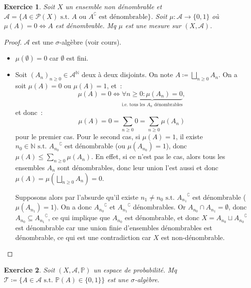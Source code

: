 \documentclass{article}
\newtheorem{ex}{Exercice}[section]
\newcommand{\st}{\text{ s.t. }}
\newcommand{\C}{\complement}
\newcommand{\N}{{\mathbb N}}
\renewcommand{\P}{{\mathbb P}}
\begin{document}
\begin{ex} Soit $X$ un ensemble non dénombrable et $\mathcal A = \{A \in \mathcal P(X) \st A \text{ ou } A^\C \text{ est dénombrable}\}$. Soit $\mu : \mathcal A \to \{0, 1\}$
où $\mu(A) = 0 \iff A$ est dénombrable. Mq $\mu$ est une mesure sur $(X, \mathcal A)$.
\end{ex}

\begin{proof} $\mathcal A$ est une $\sigma$-algèbre (voir cours).
\begin{itemize}
	\item $\mu(\emptyset) = 0$ car $\emptyset$ est fini.
	\item Soit $(A_n)_{n \geq 0} \in \mathcal A^\N$ deux à deux disjoints. On note $A \coloneqq \bigsqcup_{n \geq 0}A_n$. On a soit $\mu(A) = 0$ ou $\mu(A) = 1$, et~:
	\[\mu(A) = 0 \iff \underbrace {\forall n \geq 0 : \mu(A_n) = 0}_{\text{i.e. tous les $A_n$ dénombrables}},\]
	et donc~:
	\[\mu(A) = 0 = \sum_{n \geq 0}0 = \sum_{n \geq 0}\mu(A_n)\]
	pour le premier cas. Pour le second cas, si $\mu(A) = 1$, il existe $n_0 \in \N \st {A_{n_0}}^\C$ est dénombrable (ou $\mu(A_{n_0}) = 1$), donc $\mu(A) \leq \sum_{n \geq 0}\mu(A_n)$.
	En effet, si ce n'est pas le cas, alors tous les ensembles $A_n$ sont dénombrables, donc leur union l'est aussi et donc $\mu(A) = \mu(\bigsqcup_{n \geq 0}A_n) = 0$.

	Supposons alors par l'absurde qu'il existe $n_1 \neq n_0 \st {A_{n_1}}^\C$ est dénombrable ($\mu(A_{n_1}) = 1$). On a donc ${A_{n_0}}^\C$ et ${A_{n_1}}^\C$ dénombrables.
	Or $A_{n_0} \cap A_{n_1} = \emptyset$, donc $A_{n_0} \subseteq {A_{n_1}}^\C$, ce qui implique que $A_{n_0}$ est dénombrable, et donc $X = A_{n_0} \sqcup {A_{n_0}}^\C$ est dénombrable
	car une union finie d'ensembles dénombrables est dénombrable, ce qui est une contradiction car $X$ est non-dénombrable.
\end{itemize}
\end{proof}

\begin{ex} Soit $(X, \mathcal A, \P)$ un espace de probabilité. Mq $\mathcal T \coloneqq \{A \in \mathcal A \st \P(A) \in \{0, 1\}\}$ est une $\sigma$-algèbre.
\end{ex}
\end{document}
